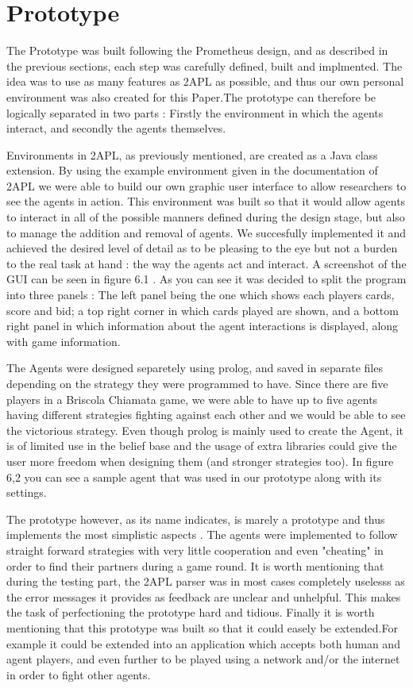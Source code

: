 \documentclass[a4paper]{article}
\begin{document}
\section{Prototype}\label{sec:proto} 

The Prototype was built following the Prometheus design, and as described in the previous sections, each step was carefully defined, built and implmented. The idea was to use as many features as 2APL as possible, and thus our own personal environment was also created for this Paper.The prototype can therefore be logically separated in two parts : Firstly the environment in which the agents interact, and secondly the agents themselves.

Environments in 2APL, as previously mentioned, are created as a Java class extension. By using the example environment given in the documentation of 2APL we were able to build our own graphic user interface to allow researchers to see the agents in action. This environment was built so that it would allow agents to interact in all of the possible manners defined during the design stage, but also to manage the addition and removal of agents. We succesfully implemented it and achieved the desired level of detail as to be pleasing to the eye but not a burden to the real task at hand : the way the agents act and interact. A screenshot of the GUI can be seen in figure 6.1 . As you can see it was decided to split the program into three panels : The left panel being the one which shows each players cards, score and bid; a top right corner in which cards played are shown, and a bottom right panel in which information about the agent interactions is displayed, along with game information.

The Agents were designed separetely using prolog, and saved in separate files depending on the strategy they were programmed to have. Since there are five players in a Briscola Chiamata game, we were able to have up to five agents having different strategies fighting against each other and we would be able to see the victorious strategy. Even though prolog is mainly used to create the Agent, it is of limited use in the belief base and the usage of extra libraries could give the user more freedom when designing them (and  stronger strategies too). In figure 6,2 you can see a sample agent that was used in our prototype along with its settings.

The prototype however, as its name indicates, is marely a prototype and thus implements the most simplistic aspects . The agents were implemented to follow straight forward strategies with very little cooperation and even "cheating" in order to find their partners during a game round. It is worth mentioning that during the testing part, the 2APL parser was in most cases completely uselesss as the error messages it provides as feedback are unclear and unhelpful. This makes the task of perfectioning the prototype hard and tidious. Finally it is worth mentioning that this prototype was built so that it could easely be extended.For example it could be extended into an application which accepts both human and agent players, and even further to be played using a network and/or the internet in order to fight other agents.
\end{document}
